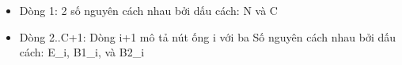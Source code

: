 \begin{itemize}
	\item     Dòng 1: 2 số nguyên cách nhau bởi dấu cách: N và C   
	\item     Dòng 2..C+1: Dòng i+1 mô tả nút ống i với ba         Số nguyên cách nhau bởi dấu cách: E\_i, B1\_i, và B2\_i   
\end{itemize}

\
